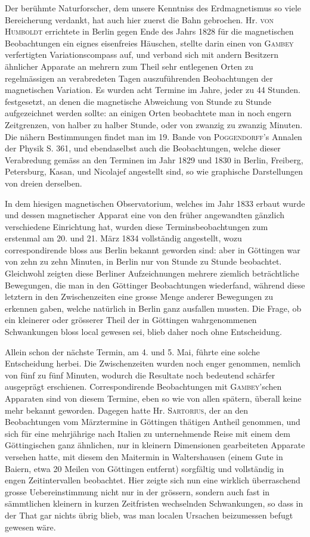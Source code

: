 Der berühmte Naturforscher, dem unsere Kenntniss des Erdmagnetismus so viele Bereicherung verdankt, hat auch hier zuerst die Bahn gebrochen. Hr. \textsc{von Humboldt} errichtete in Berlin gegen Ende des Jahrs 1828 für die magnetischen Beobachtungen ein eignes eisenfreies Häuschen, stellte darin einen von \textsc{Gambey} verfertigten Variationscompass auf, und verband sich mit andern Besitzern ähnlicher Apparate an mehrern zum Theil sehr entlegenen Orten zu regelmässigen an verabredeten Tagen auszuführenden Beobachtungen der magnetischen Variation. Es wurden acht Termine im Jahre, jeder zu 44 Stunden. festgesetzt, an denen die magnetische Abweichung von Stunde zu Stunde aufgezeichnet werden sollte: an einigen Orten beobachtete man in noch engern Zeitgrenzen, von halber zu halber Stunde, oder von zwanzig zu zwanzig Minuten. Die nähern Bestimmungen findet man im 19. Bande von \textsc{Poggendorff}'s Annalen der Physik S. 361, und ebendaselbst auch die Beobachtungen, welche dieser Verabredung gemäss an den Terminen im Jahr 1829 und 1830 in Berlin, Freiberg, Petersburg, Kasan, und Nicolajef angestellt sind, so wie graphische Darstellungen von dreien derselben.

In dem hiesigen magnetischen Observatorium, welches im Jahr 1833 erbaut wurde und dessen magnetischer Apparat eine von den früher angewandten gänzlich verschiedene Einrichtung hat, wurden diese Terminsbeobachtungen zum erstenmal am 20. und 21. März 1834 vollständig angestellt, wozu correspondirende bloss aus Berlin bekannt geworden sind: aber in Göttingen war von zehn zu zehn Minuten, in Berlin nur von Stunde zu Stunde beobachtet. Gleichwohl zeigten diese Berliner Aufzeichnungen mehrere ziemlich beträchtliche Bewegungen, die man in den Göttinger Beobachtungen wiederfand, während diese letztern in den Zwischenzeiten eine grosse Menge anderer Bewegungen zu erkennen gaben, welche natürlich in Berlin ganz ausfallen mussten. Die Frage, ob ein kleinerer oder grösserer Theil der in Göttingen wahrgenommenen Schwankungen bloss local gewesen sei, blieb daher noch ohne Entscheidung.

Allein schon der nächste Termin, am 4. und 5. Mai, führte eine solche Entscheidung herbei. Die Zwischenzeiten wurden noch enger genommen, nemlich von fünf zu fünf Minuten, wodurch die Resultate noch bedeutend schärfer ausgeprägt erschienen. Correspondirende Beobachtungen mit \textsc{Gambey}'schen Apparaten sind von diesem Termine, eben so wie von allen spätern, überall keine mehr bekannt geworden. Dagegen hatte Hr. \textsc{Sartorius}, der an den Beobachtungen vom Märztermine in Göttingen thätigen Antheil genommen, und sich für eine mehrjährige nach Italien zu unternehmende Reise mit einem dem Göttingischen ganz ähnlichen, nur in kleinern Dimensionen gearbeiteten Apparate versehen hatte, mit diesem den Maitermin in Waltershausen (einem Gute in Baiern, etwa 20 Meilen von Göttingen entfernt) sorgfältig und vollständig in engen Zeitintervallen beobachtet. Hier zeigte sich nun eine wirklich überraschend grosse Uebereinstimmung nicht nur in der grössern, sondern auch fast in sämmtlichen kleinern in kurzen Zeitfristen wechselnden Schwankungen, so dass in der That gar nichts übrig blieb, was man localen Ursachen beizumessen befugt gewesen wäre.

